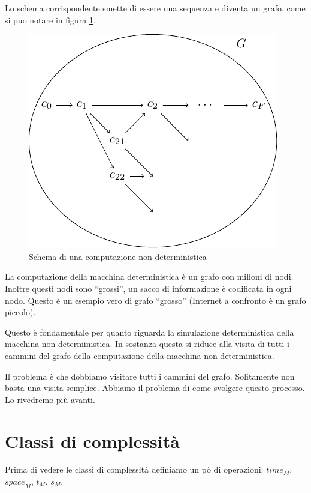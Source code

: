Lo schema corrispondente smette di essere una sequenza e diventa un grafo, come si puo notare in
figura \ref{img:nondetcomp}.

\begin{figure}[h]
    \begin{center}
        \includegraphics{img/NonDetComputation.pdf}
        \caption{Schema di una computazione non deterministica}
        \label{img:nondetcomp}
    \end{center}
\end{figure}

La computazione della macchina deterministica è un grafo con milioni di nodi. Inoltre questi nodi
sono ``grossi'', un sacco di informazione è codificata in ogni nodo. Questo è un esempio vero di
grafo ``grosso'' (Internet a confronto è un grafo piccolo).

Questo è fondamentale per quanto riguarda la simulazione deterministica della macchina non
deterministica. In sostanza questa si riduce alla visita di tutti i cammini del grafo della
computazione della macchina non deterministica.

Il problema è che dobbiamo visitare tutti i cammini del grafo. Solitamente non basta una visita
semplice. Abbiamo il problema di come svolgere questo processo. Lo rivedremo più avanti.

\section{Classi di complessità}

Prima di vedere le classi di complessità definiamo un pò di operazioni: $\textit{time}_{M}$,
$\textit{space}_{M}$, $t_{M}$, $s_{M}$.

